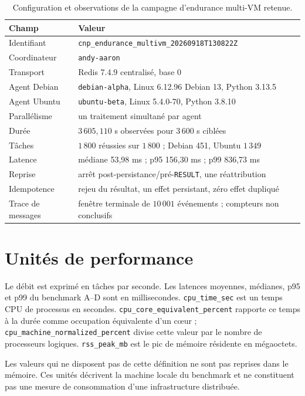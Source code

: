 \begin{table}[H]
\centering
\caption{Configuration et observations de la campagne d’endurance multi-VM retenue.}
\label{tab:multivm-parametres-annexe}
\small
\begin{tabularx}{\textwidth}{p{} X}
\toprule
\textbf{Champ} & \textbf{Valeur} \\
\midrule
Identifiant & \texttt{cnp\_endurance\_multivm\_20260918T130822Z} \\
Coordinateur & \texttt{andy-aaron} \\
Transport & Redis 7.4.9 centralisé, base 0 \\
Agent Debian & \texttt{debian-alpha}, Linux 6.12.96 Debian 13, Python 3.13.5 \\
Agent Ubuntu & \texttt{ubuntu-beta}, Linux 5.4.0-70, Python 3.8.10 \\
Parallélisme & un traitement simultané par agent \\
Durée & $3\,605{,}110$ s observées pour $3\,600$ s ciblées \\
Tâches & $1\,800$ réussies sur $1\,800$ ; Debian 451, Ubuntu $1\,349$ \\
Latence & médiane 53,98 ms ; p95 156,30 ms ; p99 836,73 ms \\
Reprise & arrêt post-persistance/pré-\texttt{RESULT}, une réattribution \\
Idempotence & rejeu du résultat, un effet persistant, zéro effet dupliqué \\
Trace de messages & fenêtre terminale de $10\,001$ événements ; compteurs non conclusifs \\
\bottomrule
\end{tabularx}
\end{table}

\section{Unités de performance}

Le débit est exprimé en tâches par seconde. Les latences moyennes, médianes, p95 et p99 du benchmark A--D sont en millisecondes. \texttt{cpu\_time\_sec} est un temps CPU de processus en secondes. \texttt{cpu\_core\_equivalent\_percent} rapporte ce temps à la durée comme occupation équivalente d’un cœur ; \texttt{cpu\_machine\_normalized\_percent} divise cette valeur par le nombre de processeurs logiques. \texttt{rss\_peak\_mb} est le pic de mémoire résidente en mégaoctets.

Les valeurs qui ne disposent pas de cette définition ne sont pas reprises dans le mémoire. Ces unités décrivent la machine locale du benchmark et ne constituent pas une mesure de consommation d’une infrastructure distribuée.

